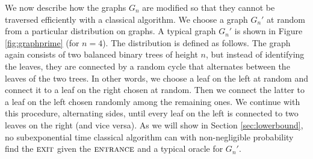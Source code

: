 \documentclass[aps,11pt,twoside,nofootinbib,tightenlines,superscriptaddress,preprintnumbers]{revtex4}
\newcommand{\<}{\langle}
\renewcommand{\>}{\rangle}
\newcommand{\ent}{{\textsc{entrance}}}
\newcommand{\exit}{{\textsc{exit}}}
\begin{document}
We now describe how the graphs $G_n$ are modified so that they cannot be
traversed efficiently with a classical algorithm.  We choose a graph
$G_n'$ at random from a particular distribution on graphs.  A typical
graph $G_n'$ is shown in Figure \ref{fig:graphprime} (for $n=4$).  The
distribution is defined as follows.  The graph again consists of two
balanced binary trees of height $n$, but instead of identifying the
leaves, they are connected by a random cycle that alternates between the
leaves of the two trees.  In other words, we choose a leaf on the left at
random and connect it to a leaf on the right chosen at random.  Then we
connect the latter to a leaf on the left chosen randomly among the
remaining ones.  We continue with this procedure, alternating sides, until
every leaf on the left is connected to two leaves on the right (and vice
versa).  As we will show in Section \ref{sec:lowerbound}, no
subexponential time classical algorithm can with non-negligible
probability find the $\exit$ given the $\ent$ and a typical oracle for
$G_n'$.
\end{document}
